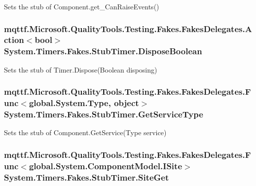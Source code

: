 Sets the stub of Component.\-get\-\_\-\-Can\-Raise\-Events()

\hypertarget{class_system_1_1_timers_1_1_fakes_1_1_stub_timer_a28403f419c15c92151d7cb950900b530}{
\subsubsection[{Dispose\-Boolean}]{\setlength{\rightskip}{0pt plus 5cm}mqttf.\-Microsoft.\-Quality\-Tools.\-Testing.\-Fakes.\-Fakes\-Delegates.\-Action$<$bool$>$ System.\-Timers.\-Fakes.\-Stub\-Timer.\-Dispose\-Boolean}}\label{class_system_1_1_timers_1_1_fakes_1_1_stub_timer_a28403f419c15c92151d7cb950900b530}


Sets the stub of Timer.\-Dispose(\-Boolean disposing)

\hypertarget{class_system_1_1_timers_1_1_fakes_1_1_stub_timer_a12eee29b116a25ab39d71ff215a59032}{
\subsubsection[{Get\-Service\-Type}]{\setlength{\rightskip}{0pt plus 5cm}mqttf.\-Microsoft.\-Quality\-Tools.\-Testing.\-Fakes.\-Fakes\-Delegates.\-Func$<$global.\-System.\-Type, object$>$ System.\-Timers.\-Fakes.\-Stub\-Timer.\-Get\-Service\-Type}}\label{class_system_1_1_timers_1_1_fakes_1_1_stub_timer_a12eee29b116a25ab39d71ff215a59032}


Sets the stub of Component.\-Get\-Service(\-Type service)

\hypertarget{class_system_1_1_timers_1_1_fakes_1_1_stub_timer_a662c6a99e082bc51329484168b466ddc}{
\subsubsection[{Site\-Get}]{\setlength{\rightskip}{0pt plus 5cm}mqttf.\-Microsoft.\-Quality\-Tools.\-Testing.\-Fakes.\-Fakes\-Delegates.\-Func$<$global.\-System.\-Component\-Model.\-I\-Site$>$ System.\-Timers.\-Fakes.\-Stub\-Timer.\-Site\-Get}}\label{class_system_1_1_timers_1_1_fakes_1_1_stub_timer_a662c6a99e082bc51329484168b466ddc}


